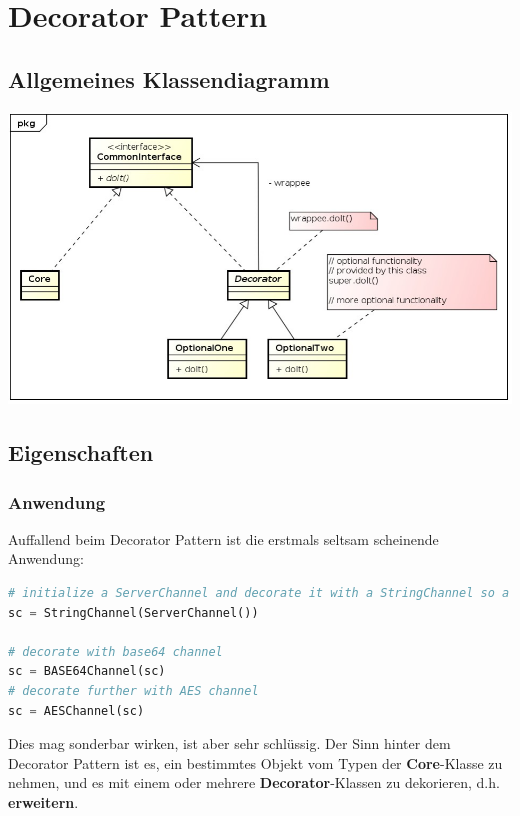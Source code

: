 \section{Decorator Pattern}
\subsection{Allgemeines Klassendiagramm}
\cite{RAFM}

\begin{minipage}{\linewidth}
	\centering
	\includegraphics[width=1\linewidth]{images/uml_general}
\end{minipage}

\subsection{Eigenschaften}
\subsubsection{Anwendung}
Auffallend beim Decorator Pattern ist die erstmals seltsam scheinende Anwendung:

\begin{lstlisting}[language=Python]
# initialize a ServerChannel and decorate it with a StringChannel so a string can be received and sent
sc = StringChannel(ServerChannel())

# decorate with base64 channel
sc = BASE64Channel(sc)
# decorate further with AES channel
sc = AESChannel(sc)
\end{lstlisting}

Dies mag sonderbar wirken, ist aber sehr schlüssig. Der Sinn hinter dem Decorator Pattern ist es, ein bestimmtes Objekt vom Typen der \textbf{Core}-Klasse zu nehmen, und es mit einem oder mehrere \textbf{Decorator}-Klassen zu dekorieren, d.h. \textbf{erweitern}. 

